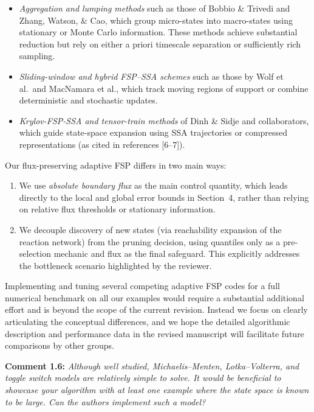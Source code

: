\documentclass[11pt]{article}
\begin{document}
\begin{itemize}
  \item \emph{Aggregation and lumping methods} such as those of Bobbio \& Trivedi and
        Zhang, Watson, \& Cao, which group micro-states into macro-states using
        stationary or Monte Carlo information. These methods achieve substantial
        reduction but rely on either a priori timescale separation or sufficiently
        rich sampling.
  \item \emph{Sliding-window and hybrid FSP–SSA schemes} such as those by Wolf
        et al.\ and MacNamara et al., which track moving regions of support or
        combine deterministic and stochastic updates.
  \item \emph{Krylov-FSP-SSA and tensor-train methods} of Dinh \& Sidje and
        collaborators, which guide state-space expansion using SSA trajectories or
        compressed representations (as cited in references [6–7]).
\end{itemize}

Our flux-preserving adaptive FSP differs in two main ways:

\begin{enumerate}
  \item We use \emph{absolute boundary flux} as the main control quantity, which
        leads directly to the local and global error bounds in Section~4, rather
        than relying on relative flux thresholds or stationary information.
  \item We decouple discovery of new states (via reachability expansion of the
        reaction network) from the pruning decision, using quantiles only as a
        pre-selection mechanic and flux as the final safeguard. This explicitly
        addresses the bottleneck scenario highlighted by the reviewer.
\end{enumerate}

Implementing and tuning several competing adaptive FSP codes for a full numerical
benchmark on all our examples would require a substantial additional effort and is
beyond the scope of the current revision. Instead we focus on clearly articulating
the conceptual differences, and we hope the detailed algorithmic description and
performance data in the revised manuscript will facilitate future comparisons by
other groups.

\vspace{0.5em}

\noindent\textbf{Comment 1.6:} \textit{Although well studied, Michaelis–Menten, Lotka–Volterra, and toggle
switch models are relatively simple to solve. It would be beneficial to showcase
your algorithm with at least one example where the state space is known to be
large. Can the authors implement such a model?}
\end{document}
